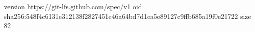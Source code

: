 version https://git-lfs.github.com/spec/v1
oid sha256:548f4c6131e312138f2827451e46a64bd7d1ea5e89127c9ffb685a19f0e21722
size 82
